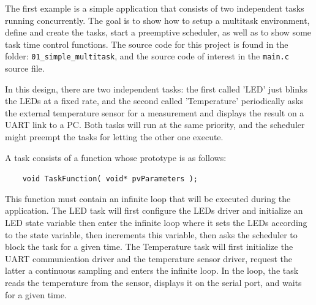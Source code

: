 \documentclass[11pt]{report}
\begin{document}
The first example is a simple application that consists of two independent tasks running concurrently. The goal is to show how to setup a multitask environment, define and create the tasks, start a preemptive scheduler, as well as to show some task time control functions. The source code for this project is found in the folder: \verb$01_simple_multitask$, and the source code of interest in the \verb$main.c$ source file.


In this design, there are two independent tasks: the first called 'LED' just blinks the LEDs at a fixed rate, and the second called 'Temperature' periodically asks the external temperature sensor for a measurement and displays the result on a UART link to a PC. Both tasks will run at the same priority, and the scheduler might preempt the tasks for letting the other one execute.

A task consists of a function whose prototype is as follows:

\verb$    void TaskFunction( void* pvParameters );$

This function must contain an infinite loop that will be executed during the application. The LED task will first configure the LEDs driver and initialize an LED state variable then enter the infinite loop where it sets the LEDs according to the state variable, then increments this variable, then asks the scheduler to block the task for a given time. The Temperature task will first initialize the UART communication driver and the temperature sensor driver, request the latter a continuous sampling and enters the infinite loop. In the loop, the task reads the temperature from the sensor, displays it on the serial port, and waits for a given time.
\end{document}
